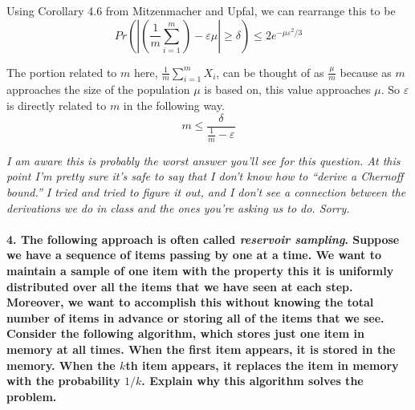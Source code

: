 \documentclass{article}
\begin{document}
Using Corollary 4.6 from Mitzenmacher and Upfal, we can rearrange this to be
\begin{equation*}
Pr\left(\left|\left(\frac{1}{m}\sum_{i=1}^m\right)-\varepsilon\mu\right| 
\geq\delta\right)\leq 2e^{-\mu\varepsilon^2/3}
\end{equation*}

The portion related to $m$ here, $\frac{1}{m}\sum\limits_{i=1}^m X_i$, can be
thought of as $\frac{\mu}{m}$ because as $m$ approaches the size of the 
population $\mu$ is based on, this value approaches $\mu$. So $\varepsilon$ is
directly related to $m$ in the following way.
\begin{equation*}
m \leq \frac{\delta}{\frac{1}{m}-\varepsilon}
\end{equation*}

\emph{I am aware this is probably the worst answer you'll see for this 
question. 
At this point I'm pretty sure it's safe to say that I don't know how to 
``derive a Chernoff bound.'' I tried and tried to figure it out, and I don't 
see 
a connection between the derivations we do in class and the ones you're asking 
us 
to do. Sorry.}

\pagebreak

\paragraph{4. The following approach is often called \emph{reservoir sampling}. 
Suppose we have a sequence of items passing by one at a time. We want to 
maintain a sample of one item with the property this it is uniformly 
distributed over all the items that we have seen at each step. Moreover, we 
want to accomplish this without knowing the total number of items in advance or 
storing all of the items that we see.\\
Consider the following algorithm, which stores just one item in memory at all 
times. When the first item appears, it is stored in the memory. When the $k$th 
item appears, it replaces the item in memory with the probability $1/k$. 
Explain why this algorithm solves the problem.\\\\}
\end{document}
